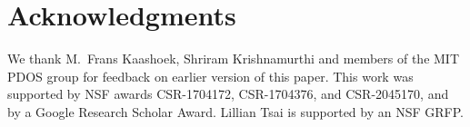 \section*{Acknowledgments}

We thank M.\ Frans Kaashoek, Shriram Krishnamurthi and members of the MIT PDOS group for feedback on
earlier version of this paper.
%
This work was supported by NSF awards CSR-1704172, CSR-1704376, and CSR-2045170, and by a Google
Research Scholar Award. Lillian Tsai is supported by an NSF GRFP.
%
